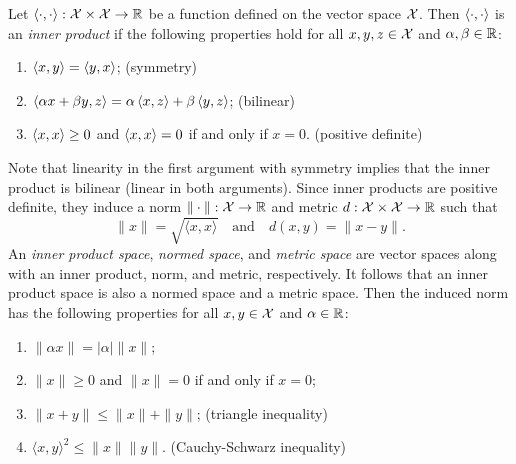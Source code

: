 \def\innerprod{\ipt{\cdot, \cdot}}
\def\qand{\quad\text{and}\quad}
% 
Let \(\innerprod : \X \times \X \to \RR\) be a function defined on the vector space \(\mathcal{X}\).
Then \(\innerprod\) is an \textit{inner product} if the following properties hold for all \(x, y, z \in \mathcal{X}\) and \(\alpha, \beta \in \mathbb{R}\):
\begin{enumerate}
    \item %
    \(\left\langle x,y \right\rangle = \left\langle y,x \right\rangle\);
    \hfill (symmetry)
    \item %
    \(\left\langle \alpha x + \beta y, z \right\rangle = \alpha \left\langle x, z \right\rangle + \beta \left\langle y, z \right\rangle\);
    \hfill (bilinear)
    \item %
    \(\left\langle x,x \right\rangle \geq 0\) and \(\left\langle x,x \right\rangle = 0\) if and only if \(x = 0\).
    \hfill (positive definite)
\end{enumerate}
Note that linearity in the first argument with symmetry implies that the inner product is bilinear (linear in both arguments).
Since inner products are positive definite, they induce a norm \(\| \cdot \| : \mathcal{X} \to \mathbb{R}\) and metric \(d : \mathcal{X} \times \mathcal{X} \to \mathbb{R}\) such that
\begin{equation}
    \|x\| = \sqrt{\langle x, x \rangle}
    \qand
    d(x,y) = \|x - y\|.
\end{equation}
An \textit{inner product space}, \textit{normed space}, and \textit{metric space} are vector spaces along with an inner product, norm, and metric, respectively.
It follows that an inner product space is also a normed space and a metric space.
Then the induced norm has the following properties for all \(x, y \in \mathcal{X}\) and \(\alpha \in \mathbb{R}\):
\begin{enumerate}
    \item \(\|\alpha x\| = |\alpha| \|x\|\);
    \item \(\|x\| \geq 0\) and \(\|x\| = 0\) if and only if \(x = 0\);
    \item \(\|x + y \| \leq \|x\| + \|y\|\);
    \hfill (triangle inequality)
    \item \(\langle x, y \rangle^2 \leq \|x\| \|y\|\).
    \hfill (Cauchy-Schwarz inequality)
\end{enumerate}